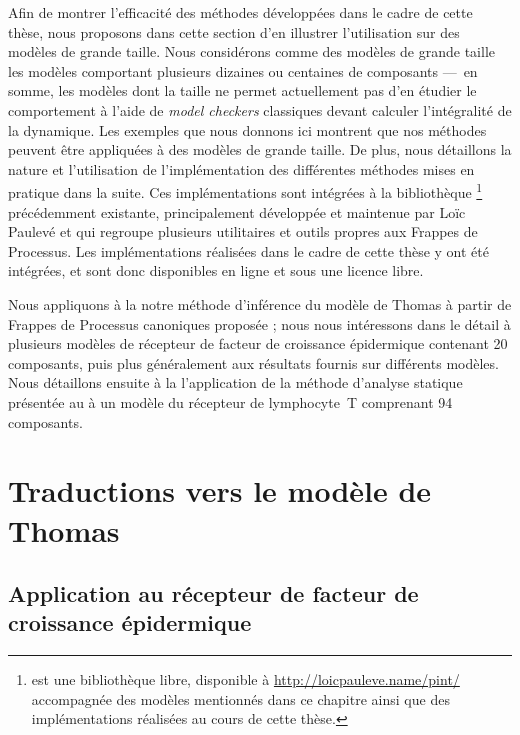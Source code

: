 Afin de montrer l'efficacité des méthodes développées dans le cadre de cette thèse,
nous proposons dans cette section d'en illustrer l'utilisation sur des modèles
de grande taille.
Nous considérons comme des modèles de grande taille les modèles comportant plusieurs
dizaines ou centaines de composants
---~en somme, les modèles dont la taille ne permet actuellement pas d'en étudier
le comportement à l'aide de \textit{model checkers} classiques
devant calculer l'intégralité de la dynamique.
Les exemples que nous donnons ici montrent que nos méthodes peuvent être
appliquées à des modèles de grande taille.
De plus, nous détaillons la nature et l'utilisation de l'implémentation
des différentes méthodes mises en pratique dans la suite.
Ces implémentations sont intégrées à la bibliothèque \Pint%
\footnote{\Pint{} est une bibliothèque libre, disponible à \url{http://loicpauleve.name/pint/}
accompagnée des modèles mentionnés dans ce chapitre
ainsi que des implémentations réalisées au cours de cette thèse.}
précédemment existante,
principalement développée et maintenue par Loïc Paulevé
et qui regroupe plusieurs utilitaires et outils propres aux Frappes de Processus.
Les implémentations réalisées dans le cadre de cette thèse y ont été intégrées,
et sont donc disponibles en ligne et sous une licence libre.

\myskip

Nous appliquons à la  notre méthode d'inférence
du modèle de Thomas à partir de Frappes de Processus canoniques proposée  ;
nous nous intéressons dans le détail à plusieurs modèles
de récepteur de facteur de croissance épidermique contenant 20 composants,
puis plus généralement aux résultats fournis sur différents modèles.
Nous détaillons ensuite à la  l'application de la méthode
d'analyse statique présentée
au  à un modèle du récepteur de lymphocyte~T comprenant 94 composants.




\section{Traductions vers le modèle de Thomas}


\subsection{Application au récepteur de facteur de croissance épidermique}

